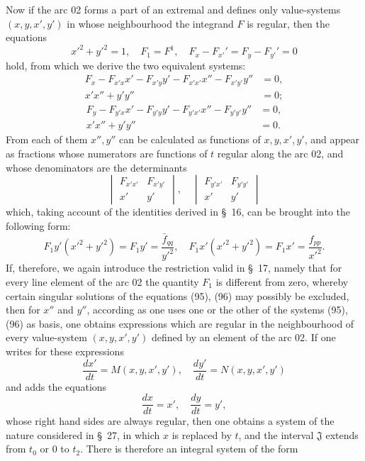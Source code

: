 \documentclass[11pt,a4paper,leqno]{article}
\begin{document}
Now if the arc 02 forms a part of an extremal and defines only value-systems $(x,y,x',y')$ in whose neighbourhood the integrand $F$ is regular, then the equations
\[
x'^2+y'^2=1,
\quad
F_1=F^1,
\quad
F_x-F_{x'}'=F_y-F_{y'}'=0
\]
hold, from which we derive the two equivalent systems:
\begin{equation}\tag{95}
\begin{aligned}
F_x-F_{x'x}x'-F_{x'y}y'-F_{x'x'}x''-F_{x'y'}y''&=0,\\
x'x''+y'y''&=0;
\end{aligned}
\end{equation}
\begin{equation}\tag{96}
\begin{aligned}
F_y-F_{y'x}x'-F_{y'y}y'-F_{y'x'}x''-F_{y'y'}y''&=0,\\
x'x''+y'y''&=0.
\end{aligned}
\end{equation}
From each of them $x'',y''$ can be calculated as functions of $x,y,x',y'$, and appear as fractions whose numerators are functions of $t$ regular along the arc 02, and whose denominators are the determinants
\[
\begin{vmatrix}
F_{x'x'}&F_{x'y'}\\
x'&y'
\end{vmatrix},
\quad
\begin{vmatrix}
F_{y'x'}&F_{y'y'}\\
x'&y'
\end{vmatrix}
\]
which, taking account of the identities derived in \S~16, can be brought into the following form:
\[
F_1y'(x'^2+y'^2)=F_1y'=\frac{\bar f_{qq}}{y'^2},
\quad
F_1x'(x'^2+y'^2)=F_1x'=\frac{f_{pp}}{x'^2}.
\]
If, therefore, we again introduce the restriction valid in \S~17, namely that for every line element of the arc 02 the quantity $F_1$ is different from zero, whereby certain singular solutions of the equations (95), (96) may possibly be excluded, then for $x''$ and $y''$, according as one uses one or the other of the systems (95), (96) as basis, one obtains expressions which are regular in the neighbourhood of every value-system $(x,y,x',y')$ defined by an element of the arc 02. If one writes for these expressions
\[
\frac{dx'}{dt}=M(x,y,x',y'),
\quad
\frac{dy'}{dt}=N(x,y,x',y')
\]
and adds the equations
\[
\frac{dx}{dt}=x',
\quad
\frac{dy}{dt}=y',
\]
whose right hand sides are always regular, then one obtains a system of the nature considered in \S~27, in which $x$ is replaced by $t$, and the interval $\mathfrak J$ extends from $t_0$ or 0 to $t_2$. There is therefore an integral system of the form
\end{document}
